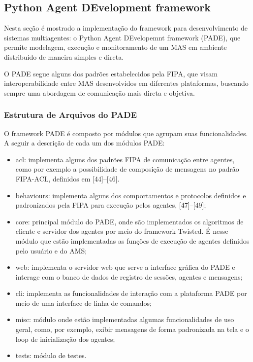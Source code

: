 \documentclass[journal]{IEEEtran}
\begin{document}
\subsection{Python Agent DEvelopment framework}

Nesta seção é mostrado a implementação do framework para desenvolvimento de sistemas multiagentes: o Python Agent DEvelopemnt framework (PADE), que permite modelagem, execução e monitoramento de um MAS em ambiente distribuído de maneira simples e direta.

O PADE segue alguns dos padrões estabelecidos pela FIPA, que visam interoperabilidade entre MAS desenvolvidos em diferentes plataformas, buscando sempre uma abordagem de comunicação mais direta e objetiva.

\subsubsection{Estrutura de Arquivos do PADE}

O framework PADE é composto por módulos que agrupam suas funcionalidades. A seguir a descrição de cada um dos módulos PADE:

\begin{itemize}
  \item acl: implementa alguns dos padrões FIPA de comunicação entre agentes, como por exemplo a possibilidade de composição de mensagens no padrão FIPA-ACL, definidos em [44]–[46].
  \item behaviours: implementa alguns dos comportamentos e protocolos definidos e padronizados pela FIPA para execução pelos agentes, [47]–[49];
  \item core: principal módulo do PADE, onde são implementados os algoritmos de cliente e servidor dos agentes por meio do framework Twisted. É nesse módulo que estão implementadas as funções de execução de agentes definidos pelo usuário e do AMS;
  \item web: implementa o servidor web que serve a interface gráfica do PADE e interage com o banco de dados de registro de sessões, agentes e mensagens;
  \item cli: implementa as funcionalidades de interação com a plataforma PADE por meio de uma interface de linha de comandos;
  \item misc: módulo onde estão implementadas algumas funcionalidades de uso geral, como, por exemplo, exibir mensagens de forma padronizada na tela e o loop de inicialização dos agentes;
  \item tests: módulo de testes.
\end{itemize}
\end{document}
